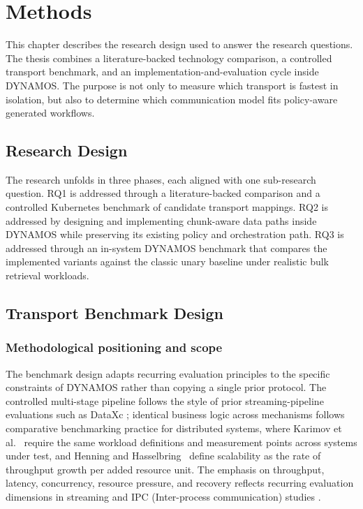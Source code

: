 \chapter{Methods}\label{ch:methods}

This chapter describes the research design used to answer the research questions. The thesis combines a literature-backed technology comparison, a controlled transport benchmark, and an implementation-and-evaluation cycle inside DYNAMOS. The purpose is not only to measure which transport is fastest in isolation, but also to determine which communication model fits policy-aware generated workflows.

\section{Research Design}

The research unfolds in three phases, each aligned with one sub-research question. RQ1 is addressed through a literature-backed comparison and a controlled Kubernetes benchmark of candidate transport mappings. RQ2 is addressed by designing and implementing chunk-aware data paths inside DYNAMOS while preserving its existing policy and orchestration path. RQ3 is addressed through an in-system DYNAMOS benchmark that compares the implemented variants against the classic unary baseline under realistic bulk retrieval workloads.

\section{Transport Benchmark Design}\label{sec:transport-method}

\subsection{Methodological positioning and scope}

The benchmark design adapts recurring evaluation principles to the specific constraints of DYNAMOS rather than copying a single prior protocol. The controlled multi-stage pipeline follows the style of prior streaming-pipeline evaluations such as DataXc \cite{coviello2022dataxc}; identical business logic across mechanisms follows comparative benchmarking practice for distributed systems, where Karimov et al.~\cite{karimov2018benchmarking} require the same workload definitions and measurement points across systems under test, and Henning and Hasselbring~\cite{Henning2021ScalabilityMetrics} define scalability as the rate of throughput growth per added resource unit. The emphasis on throughput, latency, concurrency, resource pressure, and recovery reflects recurring evaluation dimensions in streaming and IPC (Inter-process communication) studies \cite{systematicstreaming,ciftci2025ipcmechanisms}.

